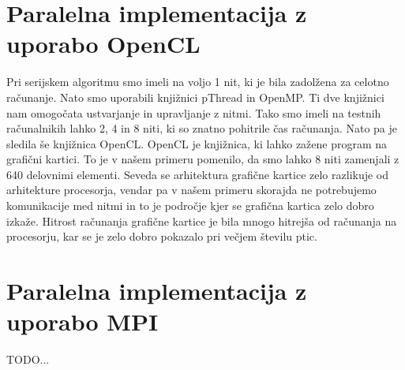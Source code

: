 \documentclass[a4paper, 12pt]{book}
\begin{document}
\chapter{Paralelna implementacija z uporabo OpenCL}
\label{ch4}
Pri serijskem algoritmu smo imeli na voljo 1 nit, ki je bila zadolžena za celotno računanje. Nato smo uporabili knjižnici pThread in OpenMP. Ti dve knjižnici nam omogočata ustvarjanje in upravljanje z nitmi. Tako smo imeli na testnih računalnikih lahko 2, 4 in 8 niti, ki so znatno pohitrile čas računanja. Nato pa je sledila še knjižnica OpenCL. OpenCL je knjižnica, ki lahko zažene program na grafični kartici. To je v našem primeru pomenilo, da smo lahko 8 niti zamenjali z 640 delovnimi elementi. Seveda se arhitektura grafične kartice zelo razlikuje od arhitekture procesorja, vendar pa v našem primeru skorajda ne potrebujemo komunikacije med nitmi in to je področje kjer se grafična kartica zelo dobro izkaže. Hitrost računanja grafične kartice je bila mnogo hitrejša od računanja na procesorju, kar se je zelo dobro pokazalo pri večjem številu ptic.

\chapter{Paralelna implementacija z uporabo MPI}
\label{ch5}
TODO...


\newpage
\ \\
\clearpage
{}


\end{document}
